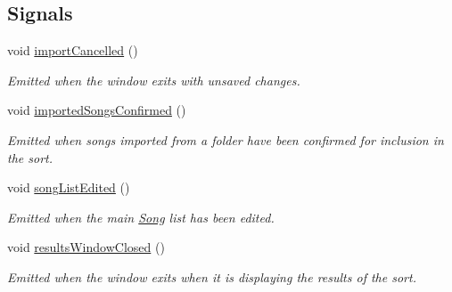 \subsection*{Signals}
\begin{DoxyCompactItemize}
\item 
void \mbox{\hyperlink{class_song_list_viewer_window_a2f54dad3e714cd08fd85080a8865f616}{import\+Cancelled}} ()
\begin{DoxyCompactList}\small\item\em Emitted when the window exits with unsaved changes. \end{DoxyCompactList}\item 
void \mbox{\hyperlink{class_song_list_viewer_window_a72159650ecd17b063a01c97b38c9c3c4}{imported\+Songs\+Confirmed}} ()
\begin{DoxyCompactList}\small\item\em Emitted when songs imported from a folder have been confirmed for inclusion in the sort. \end{DoxyCompactList}\item 
void \mbox{\hyperlink{class_song_list_viewer_window_a6fb4b39cdd5f7b9a3f8b12bcb2ec4c35}{song\+List\+Edited}} ()
\begin{DoxyCompactList}\small\item\em Emitted when the main \mbox{\hyperlink{class_song}{Song}} list has been edited. \end{DoxyCompactList}\item 
void \mbox{\hyperlink{class_song_list_viewer_window_aa87ae7b7b4d0620111303d1cad334320}{results\+Window\+Closed}} ()
\begin{DoxyCompactList}\small\item\em Emitted when the window exits when it is displaying the results of the sort. \end{DoxyCompactList}\end{DoxyCompactItemize}
